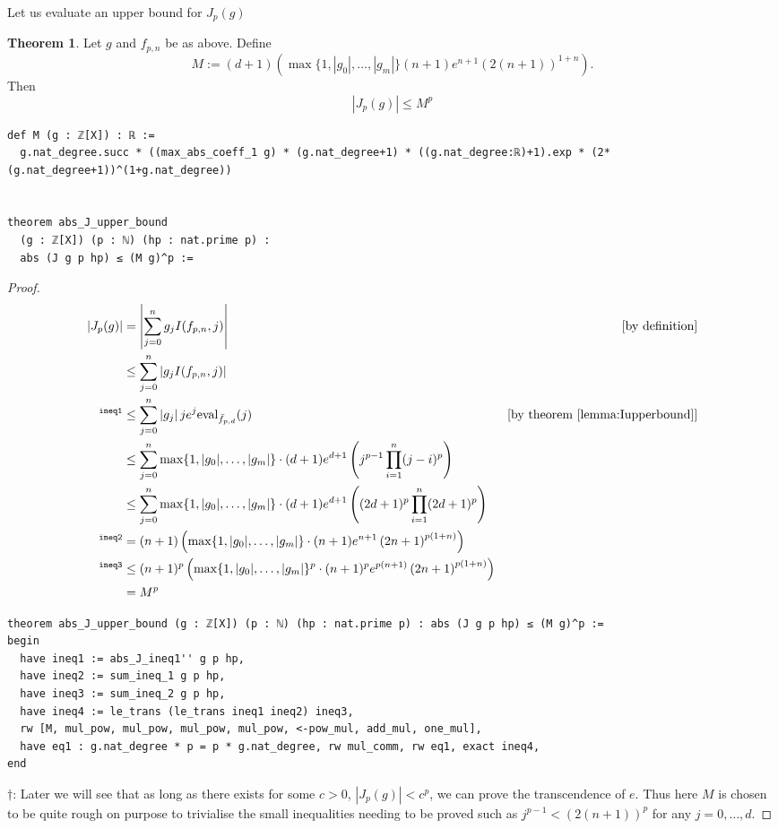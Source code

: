 \documentclass{report}
\theoremstyle{definition}
\newtheorem{theorem}{Theorem}[section]
\begin{document}
Let us evaluate an upper bound for $J_p(g)$
\begin{theorem}\label{thm:upperbound}
Let $g$ and $f_{p,n}$ be as above. Define
$$M:=(d+1)\left(\max\{1,|g_0|,\dots,|g_m|\}(n+1)e^{n+1}\left(2(n+1)\right)^{1+n}\right).$$
Then
$$
\left|J_p(g)\right|\le M^p
$$

\begin{verbatim}
def M (g : ℤ[X]) : ℝ :=
  g.nat_degree.succ * ((max_abs_coeff_1 g) * (g.nat_degree+1) * ((g.nat_degree:ℝ)+1).exp * (2*(g.nat_degree+1))^(1+g.nat_degree))


theorem abs_J_upper_bound 
  (g : ℤ[X]) (p : ℕ) (hp : nat.prime p) :
  abs (J g p hp) ≤ (M g)^p :=
\end{verbatim}
\end{theorem}

\begin{proof}
\begin{equation*}
\begin{aligned}
\left|J_p(g)\right|&=\left|\sum_{j=0}^ng_j I(f_{p,n}, j)\right| &[\text{by definition}]\\
&\le\sum_{j=0}^n\left|g_jI(f_{p,n}, j)\right|\\
{}^{\tt ineq1}&\le\sum_{j=0}^n\left|g_j\right|je^j\mathrm{eval}_{\bar{f}_{p,d}}(j)&[\text{by theorem \ref{lemma:Iupperbound}}]\\
&\le\sum_{j=0}^n\max\{1,|g_0|,\dots,|g_m|\}\cdot(d+1)e^{d+1}\left(j^{p-1}\prod_{i=1}^n(j-i)^p\right)\\
&\le\sum_{j=0}^n\max\{1,|g_0|,\dots,|g_m|\}\cdot(d+1)e^{d+1}\left((2d+1)^{p}\prod_{i=1}^n(2d+1)^p\right)\\
{}^{\tt ineq2}&=(n+1)\left(\max\{1,|g_0|,\dots,|g_m|\}\cdot(n+1)e^{n+1}\left(2n+1\right)^{p(1+n)}\right)\\
{}^{\tt ineq3}&\le(n+1)^p\left(\max\{1,|g_0|,\dots,|g_m|\}^p\cdot(n+1)^pe^{p(n+1)}\left(2n+1\right)^{p(1+n)}\right)\\
&= M^p
\end{aligned}
\end{equation*}

\begin{verbatim}
theorem abs_J_upper_bound (g : ℤ[X]) (p : ℕ) (hp : nat.prime p) : abs (J g p hp) ≤ (M g)^p :=
begin
  have ineq1 := abs_J_ineq1'' g p hp,
  have ineq2 := sum_ineq_1 g p hp,
  have ineq3 := sum_ineq_2 g p hp,
  have ineq4 := le_trans (le_trans ineq1 ineq2) ineq3,
  rw [M, mul_pow, mul_pow, mul_pow, mul_pow, <-pow_mul, add_mul, one_mul],
  have eq1 : g.nat_degree * p = p * g.nat_degree, rw mul_comm, rw eq1, exact ineq4,
end
\end{verbatim}
$\dagger$: Later we will see that as long as there exists for some $c>0$, $|J_p(g)|<c^p$, we can prove the transcendence of $e$. Thus here $M$ is chosen to be quite rough on purpose to trivialise the small inequalities needing to be proved such as $j^{p-1}<(2(n+1))^p$ for any $j=0,\dots,d$.
\end{proof}
\end{document}
